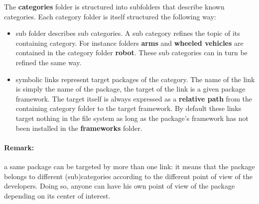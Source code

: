 \documentclass[12pt,a4paper]{article}
\begin{document}
The \textbf{categories} folder is structured into subfolders that describe known categories. Each category folder is itself structured the following way:
\begin{itemize}
\item sub folder describes sub categories. A sub category refines the topic of its containing category. For instance folders \textbf{arms} and \textbf{wheeled vehicles} are contained in the category folder \textbf{robot}. These sub categories can in turn be refined the same way.
\item symbolic links represent target packages of the category. The name of the link is simply the name of the package, the target of the link is a given package framework. The target itself is always expressed as a \textbf{relative path} from the containing category folder to the target framework. By default these links target nothing in the file system as long as the package's framework has not been installed in the \textbf{frameworks} folder.
\end{itemize}

\paragraph*{Remark:} 
a same package can be targeted by more than one link: it means that the package belongs to different (sub)categories according to the different point of view of the developers. Doing so, anyone can have his own point of view of the package depending on its center of interest.
\linebreak
\end{document}
